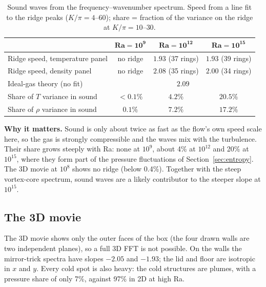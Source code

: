 \documentclass[11pt,a4paper]{article}
\begin{document}
\begin{table}[H]\centering\small
\caption{Sound waves from the frequency--wavenumber spectrum. Speed from a line fit to the ridge peaks ($K/\pi=4$--$60$); share = fraction of the variance on the ridge at $K/\pi=10$--$30$.}\label{tab:sound}
\begin{tabular}{@{}lccc@{}}
\toprule
 & \color{blue9}$\mathbf{Ra=10^{9}}$ & \color{org12}$\mathbf{Ra=10^{12}}$ & \color{grn15}$\mathbf{Ra=10^{15}}$\\
\midrule
Ridge speed, temperature panel & no ridge & $1.93$ \scriptsize(37 rings) & $1.93$ \scriptsize(39 rings)\\
Ridge speed, density panel & no ridge & $2.08$ \scriptsize(35 rings) & $2.00$ \scriptsize(34 rings)\\
Ideal-gas theory (no fit) & \multicolumn{3}{c}{$2.09$}\\
Share of $T$ variance in sound & $<0.1\%$ & $4.2\%$ & $20.5\%$\\
Share of $\rho$ variance in sound & $0.1\%$ & $7.2\%$ & $17.2\%$\\
\bottomrule
\end{tabular}
\end{table}

\textbf{Why it matters.} Sound is only about twice as fast as the flow's own speed scale here, so the gas is strongly compressible and the waves mix with the turbulence. Their share grows steeply with Ra: none at $10^{9}$, about 4\% at $10^{12}$ and 20\% at $10^{15}$, where they form part of the pressure fluctuations of Section~\ref{sec:entropy}. The 3D movie at $10^{8}$ shows no ridge (below 0.4\%). Together with the steep vortex-core spectrum, sound waves are a likely contributor to the steeper slope at $10^{15}$.

\subsection{The 3D movie}
The 3D movie shows only the outer faces of the box (the four drawn walls are two independent planes), so a full 3D FFT is not possible. On the walls the mirror-trick spectra have slopes $-2.05$ and $-1.93$; the lid and floor are isotropic in $x$ and $y$. Every cold spot is also heavy: the cold structures are plumes, with a pressure share of only 7\%, against 97\% in 2D at high Ra.
\end{document}
